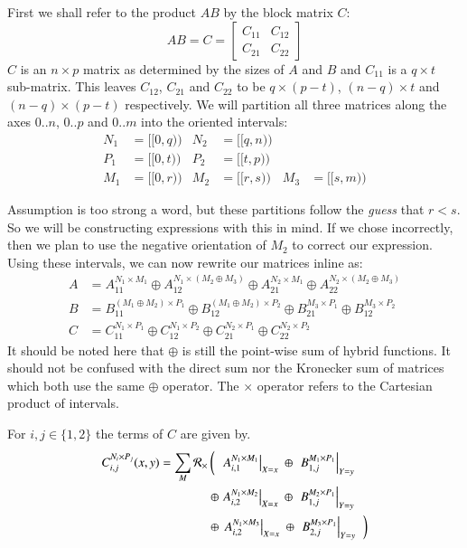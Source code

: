 First we shall refer to the product $AB$ by the block matrix $C$:
\begin{equation}
	AB = C = \begin{bmatrix} C_{11} & C_{12} \\ C_{21} & C_{22} \end{bmatrix}
\end{equation}
$C$ is an $n \times p$ matrix as determined by the sizes of $A$ and $B$ and $C_{11}$ is a $q \times t$ sub-matrix.
This leaves $C_{12}$, $C_{21}$ and $C_{22}$ to be $q \times (p-t)$, $(n-q) \times t$ and $(n-q) \times (p-t)$ respectively.
We will partition all three matrices along the axes $0.. n$, $0..p$ and $0..m$ into the oriented intervals:
\begin{align*}
	N_1 	&= [\![0, q)\!) 	& N_2 	&= [\![q, n)\!) 	\\
	P_1 	&= [\![0, t)\!) 	& P_2 	&= [\![t, p)\!) 	\\
	M_1 	&= [\![0, r)\!) 	& M_2 	&= [\![r, s)\!) 	& M_3 	&= [\![s, m)\!)
\end{align*}


Assumption is too strong a word, but these partitions follow the \emph{guess} that $r<s$.
So we will be constructing expressions with this in mind. 
If we chose incorrectly, then we plan to use the negative orientation of $M_2$ to correct our expression.
Using these intervals, we can now rewrite our matrices inline as:
\begin{align}
	A & =	A_{11}^{N_1 \times M_1} \oplus A_{12}^{N_1 \times (M_2 \oplus M_3)} \oplus 
			A_{21}^{N_2 \times M_1} \oplus A_{22}^{N_2 \times (M_2 \oplus M_3)} \\
	B & =	B_{11}^{(M_1 \oplus M_2) \times P_1} \oplus B_{12}^{(M_1 \oplus M_2) \times P_2} \oplus 
			B_{21}^{M_3 \times P_1} \oplus B_{12}^{M_3 \times P_2}\\
	\label{eqn:2x2multiplicationblocks}
	C & =	C_{11}^{N_1 \times P_1} \oplus C_{12}^{N_1 \times P_2} \oplus
			C_{21}^{N_2 \times P_1} \oplus C_{22}^{N_2 \times P_2}
\end{align}
It should be noted here that $\oplus$ is still the point-wise sum of hybrid functions.
It should not be confused with the direct sum nor the Kronecker sum of matrices which both use the same $\oplus$ operator.
The $\times$ operator refers to the Cartesian product of intervals. 


For $i,j \in \{ 1,2 \}$ the terms of $C$ are given by.
\begin{align}
	\label{eqn:2x2multiplication}
	C_{i,j}^{N_i \times P_j} (x,y) = \sum_{M} \R[\times]  
		&\left( \;\;
			\left. 	A_{i,1}^{N_1 \times M_1}	\right|_{X=x} \;\oplus\;
			\left.	B_{1,j}^{M_1 \times P_1}	\right|_{Y=y} 
		\right.  \notag \\
	 	&\oplus
	 		\left.	A_{i,2}^{N_1 \times M_2}	\right|_{X=x} \;\oplus\;
			\left. 	B_{1,j}^{M_2 \times P_1}	\right|_{Y=y} 
		\notag \\
		&\oplus\left.
			\left.	A_{i,2}^{N_1 \times M_3}	\right|_{X=x} \;\oplus\;
			\left. 	B_{2,j}^{M_3 \times P_1}	\right|_{Y=y}
		\;\;\right)
\end{align}


